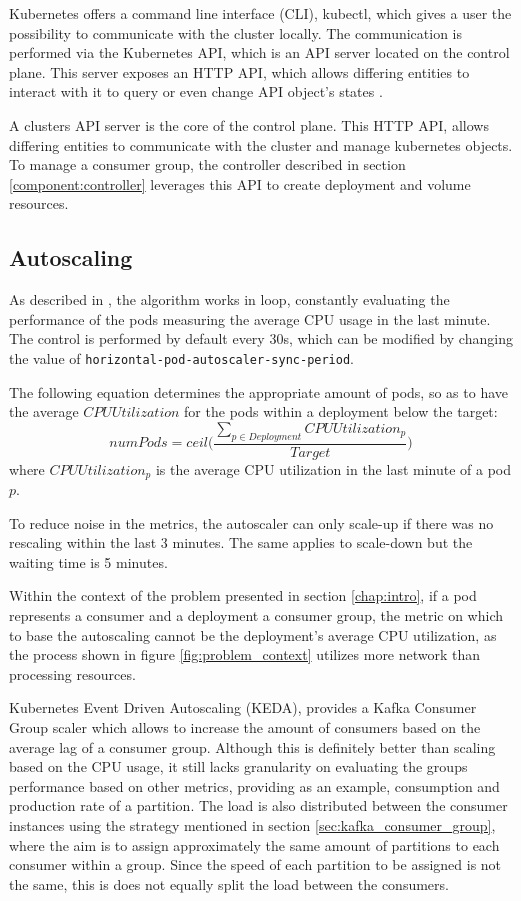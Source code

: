 Kubernetes offers a command line interface (CLI), kubectl, which gives a user the possibility to
communicate with the cluster locally. The communication is performed via the
Kubernetes API, which is an API server located on the control plane. This server
exposes an HTTP API, which allows differing entities to interact with it to
query or even change API object's states \cite{KubernetesAPI}. 

A clusters API server is the core of the control plane. This HTTP API, allows
differing entities to communicate with the cluster and manage kubernetes
objects. To manage a consumer group, the controller described in section
\ref{component:controller} leverages this API to create deployment and volume
resources.

\subsection{Autoscaling}

As described in \cite{KubernetesAutoscaling}, the algorithm works in loop,
constantly evaluating the performance of the pods measuring the average CPU
usage in the last minute. The control is performed by default every 30s, which
can be modified by changing the value of
\lstinline{horizontal-pod-autoscaler-sync-period}.

The following equation determines the appropriate amount of pods, so as to have
the average $CPUUtilization$ for the pods within a deployment below the target:
\begin{equation}
    numPods = ceil\bigg(\frac
        {\sum_{p \in Deployment} CPUUtilization_p}
        {Target}
    \bigg)
\end{equation}
where $CPUUtilization_p$ is the average CPU utilization in the last minute of a
pod $p$. 

To reduce noise in the metrics, the autoscaler can only scale-up if there was no
rescaling within the last 3 minutes. The same applies to scale-down but the
waiting time is 5 minutes.

Within the context of the problem presented in section \ref{chap:intro}, if a
pod represents a consumer and a deployment a consumer group, the metric on
which to base the autoscaling cannot be the deployment's average CPU
utilization, as the process shown in figure \ref{fig:problem_context} utilizes
more network than processing resources. 

Kubernetes Event Driven Autoscaling (KEDA), provides a Kafka Consumer Group
scaler which allows to increase the amount of consumers based on the average lag
of a consumer group. Although this is definitely better than scaling based on
the CPU usage, it still lacks granularity on evaluating the groups performance
based on other metrics, providing as an example, consumption and production rate
of a partition. The load is also distributed between the consumer instances
using the strategy mentioned in section \ref{sec:kafka_consumer_group}, where
the aim is to assign approximately the same amount of partitions to each
consumer within a group. Since the speed of each partition to be assigned is not
the same, this is does not equally split the load between the consumers.

